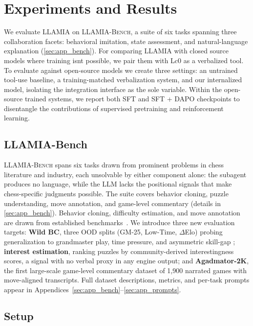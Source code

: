 \section{Experiments and Results}
\label{sec:experiments}

We evaluate \textsc{LLAMIA} on \textsc{LLAMIA-Bench}, a suite of six tasks spanning three collaboration facets: behavioral imitation, state assessment, and natural-language explanation (\cref{sec:app_bench}). For comparing LLAMIA with closed source models where training isnt possible, we pair them with Lc0 as a verbalized tool. To evaluate against open-source models we create three settings: an untrained tool-use baseline, a 
training-matched verbalization system, and our internalized model, isolating the integration interface as the sole variable.  Within the 
open-source trained systems, we report both SFT and SFT + DAPO checkpoints to disentangle the contributions of supervised pretraining and reinforcement 
learning.




\subsection{LLAMIA-Bench}
\textsc{LLAMIA-Bench} spans six tasks drawn from prominent problems in chess literature and industry, each unsolvable by either component alone: the subagent produces no language, while the LLM lacks the positional signals that make chess-specific judgments possible. The suite covers behavior cloning, puzzle understanding, move annotation, and game-level commentary (details in \cref{sec:app_bench}).
  Behavior cloning, difficulty estimation, and move annotation are drawn from established benchmarks~\cite{mcilroy2020aligning,lichess2024puzzles,jhamtani-etal-2018-learning}. We introduce three new evaluation targets: \textbf{Wild BC}, three OOD
  splits (GM-25, Low-Time, $\Delta$Elo) probing generalization to grandmaster play, time pressure, and asymmetric skill-gap
  ; \textbf{interest estimation}, ranking puzzles by community-derived interestingness scores, a signal with no
   verbal proxy in any engine output; and \textbf{Agadmator-2K}, the first large-scale game-level commentary dataset of 1,900 narrated games with move-aligned
  transcripts.
  Full dataset descriptions, metrics, and per-task prompts appear in Appendices~\ref{sec:app_bench}--\ref{sec:app_prompts}.
\subsection{Setup}
\label{sec:exp_setup}



